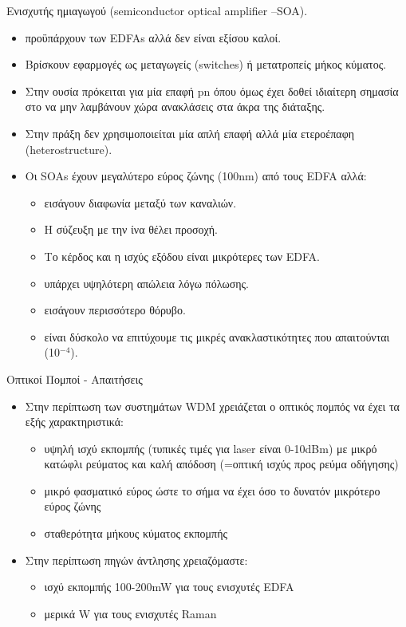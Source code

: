 \documentclass[11pt,aspectratio=169]{beamer}
\begin{document}
\begin{frame}[shrink=10,t]{Ενισχυτής ημιαγωγού (semiconductor optical amplifier –SOA).}
\begin{itemize}
\item προϋπάρχουν των EDFAs αλλά δεν είναι εξίσου καλοί.
\item Βρίσκουν εφαρμογές ως μεταγωγείς (switches) ή μετατροπείς μήκος κύματος.
\item Στην ουσία πρόκειται για μία επαφή pn όπου όμως έχει δοθεί ιδιαίτερη σημασία στο να μην λαμβάνουν χώρα ανακλάσεις στα άκρα της διάταξης.
\item Στην πράξη δεν χρησιμοποιείται μία απλή επαφή αλλά μία ετεροέπαφη (heterostructure).
\item Οι SOAs έχουν μεγαλύτερο εύρος ζώνης (100nm) από τους EDFA αλλά:
\begin{itemize}
\item εισάγουν διαφωνία μεταξύ των καναλιών.
\item Η σύζευξη με την ίνα θέλει προσοχή.
\item Το κέρδος και η ισχύς εξόδου είναι μικρότερες των EDFA.
\item υπάρχει υψηλότερη απώλεια λόγω πόλωσης.
\item εισάγουν περισσότερο θόρυβο.
\item είναι δύσκολο να επιτύχουμε τις μικρές ανακλαστικότητες που απαιτούνται (10$^{-4}$).
\end{itemize}
\end{itemize}
\end{frame}

\begin{frame}[shrink=10,t]{Οπτικοί Πομποί - Απαιτήσεις}
\begin{itemize}
\item Στην περίπτωση των συστημάτων WDM χρειάζεται ο οπτικός πομπός να έχει τα εξής χαρακτηριστικά:
\begin{itemize}
\item υψηλή ισχύ εκπομπής (τυπικές τιμές για laser είναι 0-10dBm) με μικρό κατώφλι ρεύματος και καλή απόδοση (=οπτική ισχύς προς ρεύμα οδήγησης)
\item μικρό φασματικό εύρος ώστε το σήμα να έχει όσο το δυνατόν μικρότερο εύρος ζώνης
\item σταθερότητα μήκους κύματος εκπομπής
\end{itemize}
\item Στην περίπτωση πηγών άντλησης χρειαζόμαστε:
\begin{itemize}
\item ισχύ εκπομπής 100-200mW για τους ενισχυτές EDFA
\item μερικά W για τους ενισχυτές Raman
\end{itemize}
\end{itemize}
\end{frame}
\end{document}
